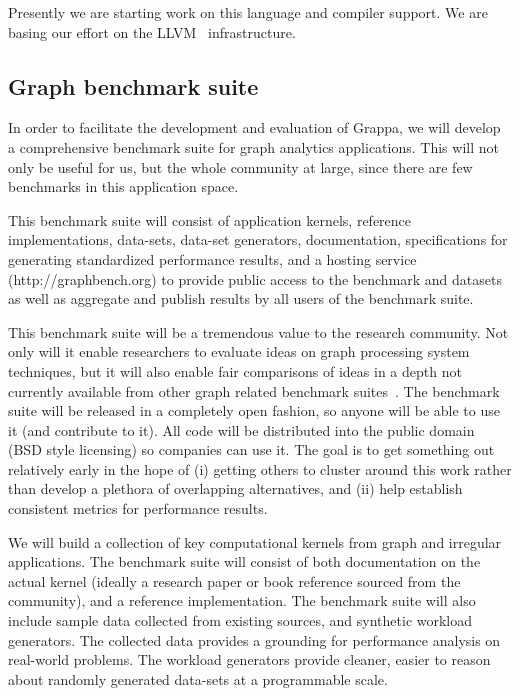 Presently we are starting work on this language and compiler support.  We are basing our effort on the LLVM~\cite{llvm} infrastructure.


\subsection{Graph benchmark suite}

In order to facilitate the development and evaluation of Grappa, we will develop a comprehensive benchmark suite for graph analytics applications. This will not only be useful for us, but the whole community at large, since there are few benchmarks in this application space.

This benchmark suite will consist of application kernels, reference implementations, data-sets, data-set generators, documentation, specifications for generating standardized performance results, and a hosting service (http://graphbench.org) to provide public access to the benchmark and datasets as well as aggregate and publish results by all users of the benchmark suite.

This benchmark suite will be a tremendous value to the research community. Not only will it enable researchers to evaluate ideas on graph processing system techniques, but it will also enable fair comparisons of ideas in a depth not currently available from other graph related benchmark suites~\cite{graph500}. The benchmark suite will be released in a completely open fashion, so anyone will be able to use it (and contribute to it).  All code will be distributed into the public domain (BSD style licensing) so companies can use it. The goal is to get something out relatively early in the hope of (i) getting others to cluster around this work rather than develop a plethora of overlapping alternatives, and (ii) help establish consistent metrics for performance results.

We will build a collection of key computational kernels from graph and irregular applications. The benchmark suite will consist of both documentation on the actual kernel (ideally a research paper or book reference sourced from the community), and a reference implementation. The benchmark suite will also include sample data collected from existing sources, and synthetic workload generators. The collected data provides a grounding for performance analysis on real-world problems. The workload generators provide cleaner, easier to reason about randomly generated data-sets at a programmable scale.

